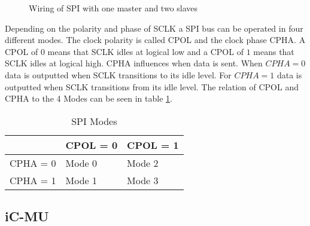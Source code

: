 \begin{figure}[hp]
    \begin{center}
        
        \caption{Wiring of SPI with one master and two slaves}
        \label{fig:spi}
    \end{center}
\end{figure}

Depending on the polarity and phase of SCLK a SPI bus can be operated in four different modes.
The clock polarity is called CPOL and the clock phase CPHA.
A CPOL of $0$ means that SCLK idles at logical low and a CPOL of $1$ means that SCLK idles at logical high.
CPHA influences when data is sent.
When $CPHA = 0$ data is outputted when SCLK transitions to its idle level.
For $CPHA = 1$ data is outputted when SCLK transitions from its idle level.
The relation of CPOL and CPHA to the 4 Modes can be seen in table \ref{tab:spi_modes}.

\begin{table}[hp]
    \begin{tabular}{|l|l|l|}
        \hline
                    & CPOL = 0  & CPOL = 1     \\ \hline
        CPHA = 0    & Mode 0    & Mode 2    \\ \hline
        CPHA = 1    & Mode 1    & Mode 3    \\ \hline
    \end{tabular}
    \caption{SPI Modes}
    \label{tab:spi_modes}
\end{table}

\subsection{iC-MU}
\label{sec:background:hardware:ic-mu}
